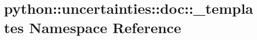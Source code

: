 \hypertarget{namespacepython_1_1uncertainties_1_1doc_1_1__templates}{
\section{python::uncertainties::doc::\_\-templates Namespace Reference}
\label{namespacepython_1_1uncertainties_1_1doc_1_1__templates}
}
